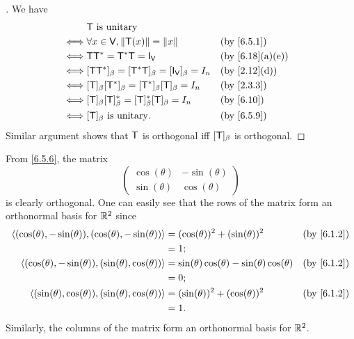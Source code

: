 \begin{proof}[]
	We have
	\begin{align*}
		     & \T \text{ is unitary}                                                               \\
		\iff & \forall x \in \V, \norm{\T(x)} = \norm{x}                       &  & \by{6.5.1}     \\
		\iff & \T \T^* = \T^* \T = \IT[\V]                                     &  & \by{6.18}[a,e] \\
		\iff & [\T \T^*]_{\beta} = [\T^* \T]_{\beta} = [\IT[\V]]_{\beta} = I_n &  & \by{2.12}[d]   \\
		\iff & [\T]_{\beta} [\T^*]_{\beta} = [\T^*]_{\beta} [\T]_{\beta} = I_n &  & \by{2.3.3}     \\
		\iff & [\T]_{\beta} [\T]_{\beta}^* = [\T]_{\beta}^* [\T]_{\beta} = I_n &  & \by{6.10}      \\
		\iff & [\T]_{\beta} \text{ is unitary}.                                &  & \by{6.5.9}
	\end{align*}
	Similar argument shows that \(\mathsf{T}\) is orthogonal iff \([\mathsf{T}]_{\beta}\) is orthogonal.
\end{proof}

\begin{eg}\label{6.5.11}
	From \cref{6.5.6}, the matrix
	\[
		\begin{pmatrix}
			\cos(\theta) & -\sin(\theta) \\
			\sin(\theta) & \cos(\theta)
		\end{pmatrix}
	\]
	is clearly orthogonal.
	One can easily see that the rows of the matrix form an orthonormal basis for \(\mathbb{R}^2\) since
	\begin{align*}
		\inn{(\cos(\theta), -\sin(\theta)), (\cos(\theta), -\sin(\theta))} & = (\cos(\theta))^2 + (\sin(\theta))^2                   &  & \by{6.1.2} \\
		                                                                   & = 1;                                                                    \\
		\inn{(\cos(\theta), -\sin(\theta)), (\sin(\theta), \cos(\theta))}  & = \sin(\theta) \cos(\theta) - \sin(\theta) \cos(\theta) &  & \by{6.1.2} \\
		                                                                   & = 0;                                                                    \\
		\inn{(\sin(\theta), \cos(\theta)), (\sin(\theta), \cos(\theta))}   & = (\sin(\theta))^2 + (\cos(\theta))^2                   &  & \by{6.1.2} \\
		                                                                   & = 1.
	\end{align*}
	Similarly, the columns of the matrix form an orthonormal basis for \(\mathbb{R}^2\).
\end{eg}

